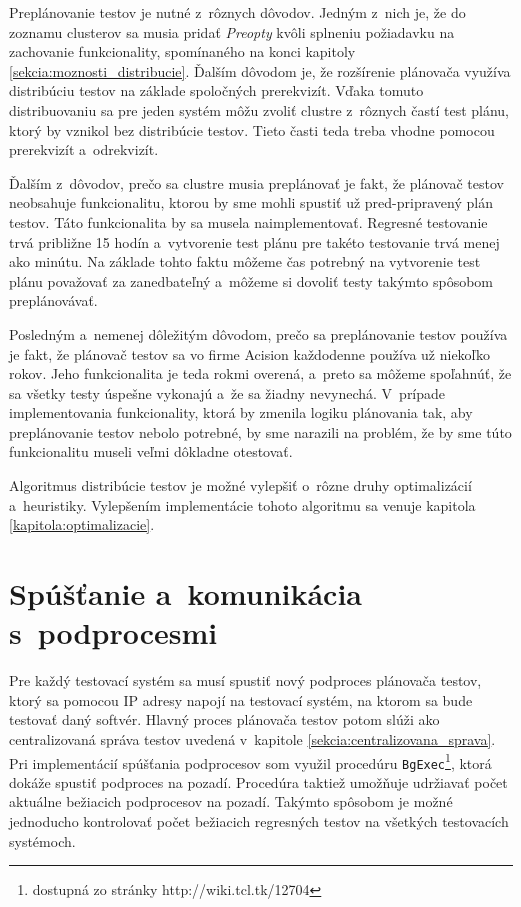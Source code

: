 Preplánovanie testov je nutné z~rôznych dôvodov. Jedným z~nich je, 
že do zoznamu clusterov sa musia pridať \textit{Preopty} kvôli splneniu 
požiadavku na zachovanie funkcionality, spomínaného na konci kapitoly 
\ref{sekcia:moznosti_distribucie}. 
Ďalším dôvodom je, že rozšírenie plánovača využíva distribúciu testov 
na základe spoločných prerekvizít. 
Vďaka tomuto distribuovaniu sa pre jeden systém môžu zvoliť clustre 
z~rôznych častí test plánu, ktorý by vznikol bez distribúcie testov.
Tieto časti teda treba vhodne  pomocou prerekvizít 
a~odrekvizít. 

Ďalším z~dôvodov, prečo sa clustre musia preplánovať je fakt, že 
plánovač testov neobsahuje funkcionalitu, ktorou by sme mohli spustiť 
už pred-pripravený plán testov. Táto funkcionalita by sa musela 
naimplementovať. Regresné testovanie trvá približne 15 hodín 
a~vytvorenie test plánu pre takéto testovanie trvá menej ako minútu.
Na základe tohto faktu môžeme čas potrebný na vytvorenie test plánu 
považovať za zanedbateľný a~môžeme si dovoliť testy takýmto spôsobom 
preplánovávať.

Posledným a~nemenej dôležitým dôvodom, prečo sa preplánovanie testov 
používa je fakt, že plánovač testov sa vo firme Acision každodenne 
používa už niekoľko rokov.
Jeho funkcionalita je teda rokmi overená, a~preto sa môžeme spoľahnúť, 
že sa všetky testy úspešne vykonajú a~že sa žiadny nevynechá.
V~prípade implementovania funkcionality, ktorá by zmenila logiku 
plánovania tak, aby preplánovanie testov nebolo potrebné, by sme narazili 
na problém, že by sme túto funkcionalitu museli veľmi dôkladne otestovať. 

Algoritmus distribúcie testov je možné vylepšiť o~rôzne druhy 
optimalizácií a~heuristiky. Vylepšením implementácie tohoto algoritmu 
sa venuje kapitola \ref{kapitola:optimalizacie}. 


\section{Spúšťanie a~komunikácia s~podprocesmi}
\label{sekcia:spustanie_podprocesov}
Pre každý testovací systém sa musí spustiť nový podproces plánovača 
testov, ktorý sa pomocou IP adresy napojí na testovací systém, 
na ktorom sa bude testovať daný softvér. Hlavný proces plánovača testov 
potom slúži ako centralizovaná správa testov uvedená
v~kapitole \ref{sekcia:centralizovana_sprava}.
Pri implementácií spúšťania podprocesov som využil procedúru 
\texttt{BgExec}\footnote{dostupná zo stránky http://wiki.tcl.tk/12704},
ktorá dokáže spustiť podproces na pozadí. Procedúra taktiež umožňuje 
udržiavať počet aktuálne bežiacich podprocesov na pozadí.
Takýmto spôsobom je možné jednoducho kontrolovať počet bežiacich 
regresných testov na všetkých testovacích systémoch.

